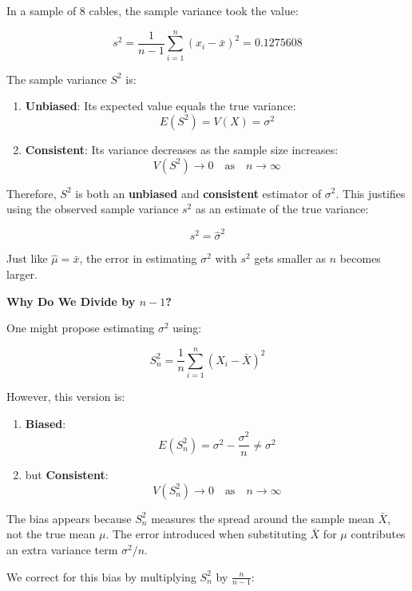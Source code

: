 \documentclass[
]{book}
\providecommand{\tightlist}{%
  \setlength{\itemsep}{0pt}\setlength{\parskip}{0pt}}
\begin{document}
In a sample of \(8\) cables, the sample variance took the value:

\[
s^2 = \frac{1}{n - 1} \sum_{i=1}^n (x_i - \bar{x})^2 = 0.1275608
\]

The sample variance \(S^2\) is:

\begin{enumerate}
\def\labelenumi{\arabic{enumi}.}
\tightlist
\item
  \textbf{Unbiased}: Its expected value equals the true variance:\\
  \[
  E(S^2) = V(X) = \sigma^2
  \]
\item
  \textbf{Consistent}: Its variance decreases as the sample size increases:\\
  \[
  V(S^2) \to 0 \quad \text{as} \quad n \to \infty
  \]
\end{enumerate}

Therefore, \(S^2\) is both an \textbf{unbiased} and \textbf{consistent} estimator of \(\sigma^2\). This justifies using the observed sample variance \(s^2\) as an estimate of the true variance:

\[
s^2 = \hat{\sigma}^2
\]

Just like \(\hat{\mu} = \bar{x}\), the error in estimating \(\sigma^2\) with \(s^2\) gets smaller as \(n\) becomes larger.

\textbf{Why Do We Divide by \(n - 1\)?}

One might propose estimating \(\sigma^2\) using:

\[
S_n^2 = \frac{1}{n} \sum_{i=1}^n (X_i - \bar{X})^2
\]

However, this version is:

\begin{enumerate}
\def\labelenumi{\arabic{enumi}.}
\tightlist
\item
  \textbf{Biased}:\\
  \[
  E(S_n^2) = \sigma^2 - \frac{\sigma^2}{n} \neq \sigma^2
  \]
\item
  but \textbf{Consistent}:\\
  \[
  V(S_n^2) \to 0 \quad \text{as} \quad n \to \infty
  \]
\end{enumerate}

The bias appears because \(S_n^2\) measures the spread around the sample mean \(\bar{X}\), not the true mean \(\mu\). The error introduced when substituting \(\bar{X}\) for \(\mu\) contributes an extra variance term \(\sigma^2 / n\).

We correct for this bias by multiplying \(S_n^2\) by \(\frac{n}{n - 1}\):
\end{document}
